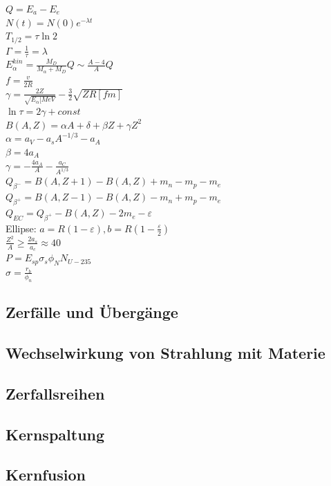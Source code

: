 \documentclass[12pt,a4paper]{article}
\renewcommand{\=}[1]{\stackrel{#1}{=}}
\theoremstyle{definition}
\theoremstyle{remark}
\begin{document}
$Q = E_a - E_e$\\
$N(t) = N(0) e^{-\lambda t}$\\
$T_{1/2} = \tau \ln 2$\\
$\Gamma = \frac{1}{\tau} = \lambda$\\
$E_{\alpha}^{kin} = \frac{M_D}{M_{\alpha} + M_D} Q \sim \frac{A-4}{A}Q$\\
$f = \frac{v}{2R}$\\
$\gamma = \frac{2Z}{\sqrt{E_{\alpha} [MeV}}-\frac{3}{2} \sqrt{Z R [fm]}$\\
$\ln \tau = 2\gamma + const$\\
$B(A, Z) = \alpha A + \delta + \beta Z + \gamma Z^2$\\
$\alpha = a_V - a_s A^{-1/3} - a_A$\\
$\beta = 4a_A$\\
$\gamma = -\frac{4a_A}{A} - \frac{a_C}{A^{1/3}}$\\
$Q_{\beta^-} = B(A, Z+1) - B(A,Z) + m_n - m_p - m_e$\\
$Q_{\beta^+} = B(A, Z-1) - B(A,Z) - m_n + m_p - m_e$\\
$Q_{EC} = Q_{\beta^+} - B(A,Z) - 2m_e - \varepsilon$\\
Ellipse: $a = R(1-\varepsilon), b = R(1-\frac{\varepsilon}{2})$\\
$\frac{Z^2}{A} \geq \frac{2a_s}{a_c} \approx 40$\\
$P = E_{sp} \sigma_s \phi_N N_{U-235}$\\
$\sigma = \frac{r_b}{\phi_n}$

\subsection{Zerfälle und Übergänge}

\subsection{Wechselwirkung von Strahlung mit Materie}

\subsection{Zerfallsreihen}

\subsection{Kernspaltung}

\subsection{Kernfusion}
\end{document}
